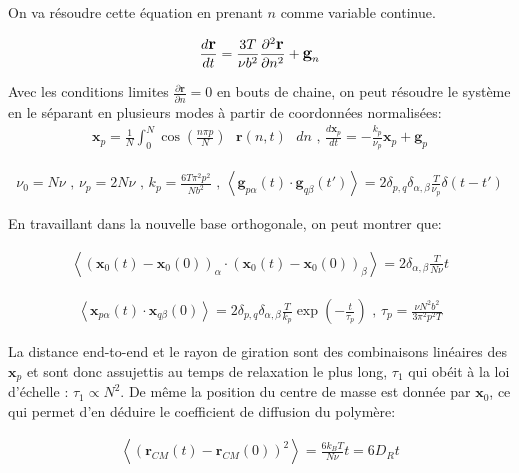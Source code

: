 \documentclass[a4paper,11pt]{article}
\begin{document}
On va résoudre cette équation en prenant $n$ comme variable continue.

\begin{eqnarray}
\large{
\frac{d \textbf{r}}{dt} =  \frac{3T}{\nu b^2}\frac{\partial ^2 \textbf{r}}{\partial  n^2} + \textbf{g}_n}
\end{eqnarray}

Avec les conditions limites $\frac{\partial  \textbf{r}}{\partial  n}=0$ en bouts de chaine, on peut résoudre le système en le séparant en plusieurs modes à  partir de coordonnées normalisées: 
\begin{eqnarray}
\textbf{x}_p= \frac{1}{N} \int_0^N \cos \left(\frac{n\pi p}{N}\right) \text{ }\textbf{r}(n,t)\text{ } dn \text{ , } \frac{d \textbf{x}_p}{dt} =  -\frac{k_p}{\nu _p} \textbf{x}_p + \textbf{g}_p
\end{eqnarray}



\begin{eqnarray}
\nu_0=  N \nu \text{ , } \nu_p= 2 N \nu  \text{ , }  k_p=\frac{6T\pi^2 p^2}{N b^2}  \text{ , }  \left<\textbf{g}_{p\alpha}(t) \cdot \textbf{g}_{q\beta}(t')\right> = 2\delta_{p,q} \delta_{\alpha ,\beta} \frac{T}{\nu_p} \delta(t-t')
\end{eqnarray}

En travaillant dans la nouvelle base orthogonale, on peut montrer que:


\begin{eqnarray}
\left<(\textbf{x}_{0}(t)-\textbf{x}_{0}(0))_\alpha \cdot (\textbf{x}_{0}(t)-\textbf{x}_{0}(0))_\beta \right> = 2 \delta_{\alpha ,\beta} \frac{T}{N\nu}t
\end{eqnarray}

\begin{eqnarray}
\left<\textbf{x}_{p\alpha}(t) \cdot \textbf{x}_{q\beta}(0)\right> = 2\delta_{p,q} \delta_{\alpha ,\beta} \frac{T}{k_p} \exp\left(-\frac{t}{\tau_p}\right) \text{ , } \tau _p = \frac{\nu N^2 b^2}{3\pi^2p^2T}
\end{eqnarray}

La distance end-to-end et le rayon de giration sont des combinaisons linéaires des $\textbf{x}_p$ et sont donc assujettis  au temps de relaxation le plus long, $\tau_1$ qui obéit à la loi d'échelle : $\tau_1 \propto N^2$. De même la position du centre de masse est donnée par $\textbf{x}_0$, ce qui permet d'en déduire le coefficient de diffusion du polymère:


\begin{eqnarray}
\left<(\textbf{r}_{CM}(t)-\textbf{r}_{CM}(0))^2\right>=\frac{6 k_B T}{N \nu} t = 6 D_R t
\label{fluctudissip}
\end{eqnarray}
\end{document}
